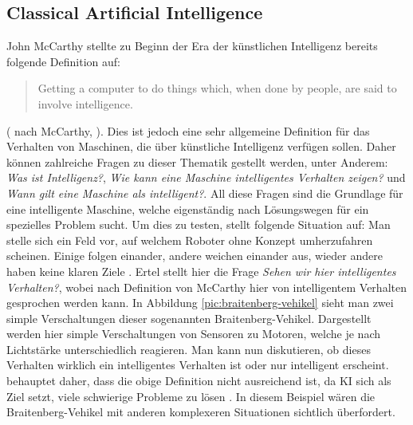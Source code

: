         \subsection{Classical Artificial Intelligence}\label{subsec:cai}
            John McCarthy stellte zu Beginn der Era der künstlichen Intelligenz bereits folgende Definition
            auf:
            \begin{quote}
                Getting a computer to do things which, when done by people, are said to involve intelligence.
            \end{quote}
            (\citeauthor{ertel2016grundkurs} nach McCarthy, \citeyear{ertel2016grundkurs}). Dies ist jedoch eine sehr
            allgemeine Definition für das Verhalten von Maschinen, die über künstliche Intelligenz verfügen sollen.
            Daher können zahlreiche Fragen zu dieser Thematik gestellt werden, unter Anderem: \textit{Was ist Intelligenz?},
            \textit{Wie kann eine Maschine intelligentes Verhalten zeigen?} und \textit{Wann gilt eine Maschine als intelligent?}.
            All diese Fragen sind die Grundlage für eine intelligente Maschine, welche eigenständig nach Lösungswegen
            für ein spezielles Problem sucht. Um dies zu testen, stellt \citeauthor{ertel2016grundkurs} folgende Situation
            auf: Man stelle sich ein Feld vor, auf welchem Roboter ohne Konzept umherzufahren scheinen. Einige folgen einander,
            andere weichen einander aus, wieder andere haben keine klaren Ziele \cite[s. 2]{ertel2016grundkurs}.
            Ertel stellt hier die Frage \textit{Sehen wir hier intelligentes Verhalten?}, wobei nach Definition von
            McCarthy hier von intelligentem Verhalten gesprochen werden kann. In Abbildung \ref{pic:braitenberg-vehikel}
            sieht man zwei simple Verschaltungen dieser sogenannten Braitenberg-Vehikel. Dargestellt werden hier simple
            Verschaltungen von Sensoren zu Motoren, welche je nach Lichtstärke unterschiedlich reagieren.
            Man kann nun diskutieren, ob dieses Verhalten wirklich ein intelligentes Verhalten ist oder
            nur intelligent erscheint. \citeauthor{ertel2016grundkurs} behauptet daher, dass die obige Definition nicht
            ausreichend ist, da KI sich als Ziel setzt, viele schwierige Probleme zu lösen \citeyearpar{ertel2016grundkurs}.
            In diesem Beispiel wären die Braitenberg-Vehikel mit anderen komplexeren Situationen sichtlich überfordert.

